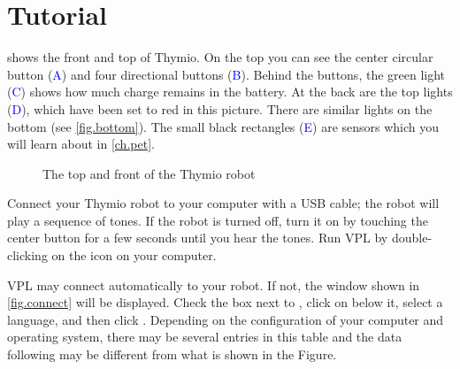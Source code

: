 
\part{Tutorial}

\label{ch.intro}


 shows the front and top of Thymio. On the top you
can see the center circular button (\textcolor{blue}{A}) and four
directional buttons (\textcolor{blue}{B}). Behind the buttons, the green
light (\textcolor{blue}{C}) shows how much charge remains in the
battery. At the back are the top lights (\textcolor{blue}{D}), which
have been set to red in this picture. There are similar lights on the
bottom (see \cref{fig.bottom}). The small black rectangles
(\textcolor{blue}{E}) are sensors which you will learn about in
\cref{ch.pet}.

\begin{figure}[h]
\begin{center}
\caption{The top and front of the Thymio robot}\label{fig.front}
\end{center}
\end{figure}


Connect your Thymio robot to your computer with a USB cable; the robot
will play a sequence of tones. If the robot is turned off, turn it on by
touching the center button for a few seconds until you hear the tones.
Run VPL by double-clicking on the icon  on your
computer.


VPL may connect automatically to your robot. If not, the window shown in
\cref{fig.connect} will be displayed. Check the box next to ,
click on  below it, select a language, and then click
. Depending on the configuration of your computer and
operating system, there may be several entries in this table and the
data following  may be different from what is shown in
the Figure.


